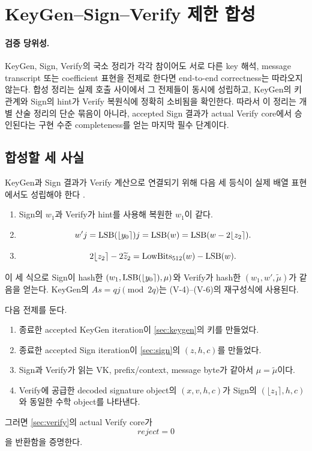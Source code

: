 \section{KeyGen--Sign--Verify 제한 합성}
\label{sec:composition}

\paragraph{검증 당위성.}
KeyGen, Sign, Verify의 국소 정리가 각각 참이어도 서로 다른 key 해석, message
transcript 또는 coefficient 표현을 전제로 한다면 end-to-end correctness는
따라오지 않는다. 합성 정리는 실제 호출 사이에서 그 전제들이 동시에 성립하고,
KeyGen의 키 관계와 Sign의 hint가 Verify 복원식에 정확히 소비됨을 확인한다.
따라서 이 정리는 개별 산술 정리의 단순 묶음이 아니라, accepted Sign 결과가
actual Verify core에서 승인된다는 구현 수준 completeness를 얻는 마지막
필수 단계이다.

\subsection{합성할 세 사실}

KeyGen과 Sign 결과가 Verify 계산으로 연결되기 위해 다음 세 등식이 실제
배열 표현에서도 성립해야 한다 \cite{haetae-spec}.

\begin{enumerate}
  \item Sign의 \(w_1\)과 Verify가 hint를 사용해 복원한 \(w_1\)이 같다.
  \item
  \[
    w'j=\operatorname{LSB}(\lfloor y_0\rceil)j
       =\operatorname{LSB}(w)
       =\operatorname{LSB}(w-2\lfloor z_2\rceil).
  \]
  \item
  \[
    2\lfloor z_2\rceil-2\widetilde z_2
       =\operatorname{LowBits}_{512}(w)-\operatorname{LSB}(w).
  \]
\end{enumerate}

이 세 식으로 Sign이 hash한 \((w_1,\operatorname{LSB}(\lfloor y_0\rceil),\mu)\)와
Verify가 hash한 \((w_1,w',\widetilde\mu)\)가 같음을 얻는다. KeyGen의
\(As=qj\pmod{2q}\)는 \textup{(V-4)}--\textup{(V-6)}의 재구성식에
사용된다.

\begin{verificationgoal}
다음 전제를 둔다.
\begin{enumerate}
  \item 종료한 accepted KeyGen iteration이 \cref{sec:keygen}의 키를 만들었다.
  \item 종료한 accepted Sign iteration이 \cref{sec:sign}의
        \((z,h,c)\)를 만들었다.
  \item Sign과 Verify가 읽는 VK, prefix/context, message byte가 같아서
        \(\mu=\widetilde\mu\)이다.
  \item Verify에 공급한 decoded signature object의 \((x,v,h,c)\)가 Sign의
        \((\lfloor z_1\rceil,h,c)\)와 동일한 수학 object를 나타낸다.
\end{enumerate}
그러면 \cref{sec:verify}의 actual Verify core가
\[
  reject=0
\]
을 반환함을 증명한다.
\end{verificationgoal}

